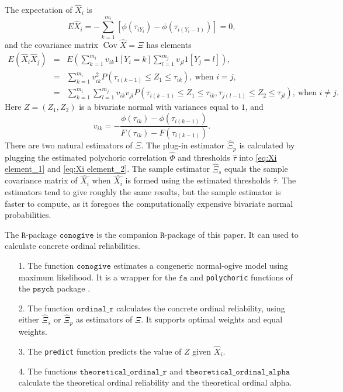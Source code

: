 \documentclass[twoside]{article}
\DeclareMathOperator{\Cov}{Cov}
\begin{document}
The expectation of $\hat{X}_{i}$ is
\begin{equation*}
E\hat{X}_{i} = -\sum_{k=1}^{m_{i}}[\phi(\tau_{iY_{i}})-\phi(\tau_{i(Y_{i}-1)})]=0,
\end{equation*}
and the covariance matrix $\Cov\hat{X}=\Xi$ has elements
\begin{eqnarray}
E(\hat{X}_{i}\hat{X}_{j}) & = & E\left(\sum_{k=1}^{m_{i}}v_{ik}1[Y_{i}=k]\sum_{l=1}^{m_{j}}v_{jl}1[Y_{j}=l]\right),\nonumber \\
& = & \sum_{k=1}^{m_{i}}v_{ik}^2P(\tau_{i(k-1)}\leq Z_{1}\leq\tau_{ik}), \: \textrm{when } i = j, \label{eq:Xi element_1}\\
 & = & \sum_{k=1}^{m_{i}}\sum_{l=1}^{m_{j}}v_{ik}v_{jl}P(\tau_{i(k-1)}\leq Z_{1}\leq\tau_{ik},\tau_{j(l-1)}\leq Z_{2}\leq\tau_{jl}), \: \textrm{when } i\neq j.\label{eq:Xi element_2}
\end{eqnarray}
Here $Z=(Z_{1},Z_{2})$ is a bivariate normal with variances equal to $1$, and $$v_{ik}=-\frac{\phi(\tau_{ik})-\phi(\tau_{i(k-1)})}{F(\tau_{ik})-F(\tau_{i(k-1)})}.$$ There are two natural estimators of $\Xi$. The plug-in estimator $\hat{\Xi}_{p}$ is calculated by plugging the estimated polychoric correlation $\hat{\Phi}$ and thresholds $\hat{\tau}$ into \eqref{eq:Xi element_1} and \eqref{eq:Xi element_2}. The sample estimator $\hat{\Xi}_{s}$ equals the sample covariance matrix of $\hat{X_{i}}$ when $\hat{X_{i}}$ is formed using the estimated thresholds $\hat{\tau}$. The estimators tend to give roughly the same results, but the sample estimator is faster to compute, as it foregoes the computationally expensive bivariate normal probabilities. 

The $\mathtt{R}$-package $\mathtt{conogive}$ is the companion $\mathtt{R}$-package of this paper. It can used to calculate concrete ordinal reliabilities. 
\begin{itemize}
\item[1.] The function $\mathtt{conogive}$ estimates a congeneric normal-ogive
model using maximum likelihood. It is a wrapper for the $\mathtt{fa}$ and \texttt{polychoric} functions of the $\mathtt{psych}$
package \citep{psych}.
\item[2.] The function $\mathtt{ordinal\_r}$ calculates the concrete ordinal
reliability, using either $\hat{\Xi}_{s}$ or $\hat{\Xi}_{p}$ as
estimators of $\Xi$. It supports optimal weights and equal weights.
\item[3.] The \texttt{predict} function predicts the value of $Z$ given $\hat{X}_i$.
\item[4.] The functions $\mathtt{theoretical\_ordinal\_r}$ and $\mathtt{theoretical\_ordinal\_alpha}$
calculate the theoretical ordinal reliability and the theoretical
ordinal alpha. 
\end{itemize}
\end{document}
